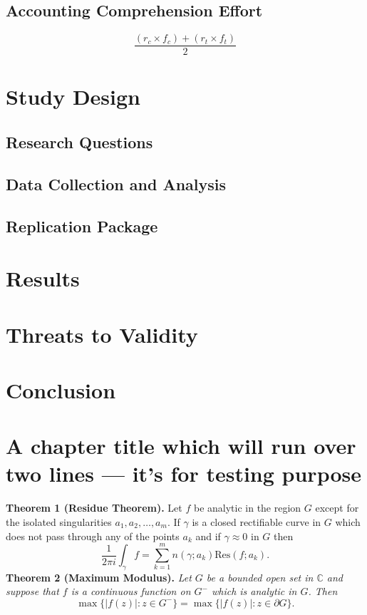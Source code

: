 \documentclass[12pt,mscthesis]{usiinfthesis}
\begin{document}
\section{Accounting Comprehension Effort }

\[\frac{(r_{c}\times f_{c}) + (r_{t} \times f_{t})}{2} \]
	
\chapter{Study Design}
	\section{Research Questions}
	\section{Data Collection and Analysis}	
	\section{Replication Package}

\chapter{Results}

\chapter{Threats to Validity}

\chapter{Conclusion}

\chapter[Short title]{A chapter title which will run over two lines --- it's for
  testing purpose}


\textbf{Theorem 1 (Residue Theorem).}
Let $f$ be analytic in the region $G$ except for the isolated singularities $a_1,a_2,\ldots,a_m$. If $\gamma$ is a closed rectifiable curve in $G$ which does not pass through any of the points $a_k$ and if $\gamma\approx 0$ in $G$ then
\[
\frac{1}{2\pi i}\int_\gamma f = \sum_{k=1}^m n(\gamma;a_k) \text{Res}(f;a_k).
\]
\textbf{Theorem 2 (Maximum Modulus).}
\emph{Let $G$ be a bounded open set in $\mathbb{C}$ and suppose that $f$ is a continuous function on $G^-$ which is analytic in $G$. Then}
\[
\max\{|f(z)|:z\in G^-\}=\max \{|f(z)|:z\in \partial G \}.
\]
\end{document}
